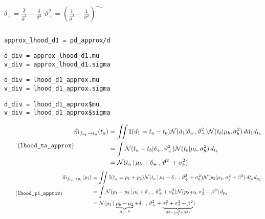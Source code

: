 \documentclass[article]{jss}
\newif\ifen
\newif\ifes
\newcommand{\en}[1]{\ifen#1\fi}
\newcommand{\es}[1]{\ifes#1\fi}
\newcommand{\N}{\mathcal{N}}
\begin{document}
%
\en{with} $\delta_{\div} = \frac{\widehat{\delta}}{\widehat{\vartheta}^2} - \frac{\delta}{\vartheta^2}$ \en{and} $\vartheta_{\div}^2 = (\frac{1}{\widehat{\vartheta}^2} - \frac{1}{\vartheta^2})^{-1}$ 
%
\begin{lstlisting}[backgroundcolor=\color
{white},label=lst:d_div, caption=\relax, belowskip=-1.0 \baselineskip, aboveskip=-0 \baselineskip]
\end{lstlisting}
\begin{lstlisting}[backgroundcolor=\color{all},belowskip=-0.77 \baselineskip]
approx_lhood_d1 = pd_approx/d
\end{lstlisting}  
\begin{paracol}{3}
\begin{lstlisting}[backgroundcolor=\color{julia}]
d_div = approx_lhood_d1.mu
v_div = approx_lhood_d1.sigma
\end{lstlisting}
\switchcolumn
\begin{lstlisting}[backgroundcolor=\color{python}]
d_div = lhood_d1_approx.mu
v_div = lhood_d1_approx.sigma
\end{lstlisting}
\switchcolumn
\begin{lstlisting}[backgroundcolor=\color{r}]
d_div = lhood_d1_approx$mu
v_div = lhood_d1_approx$sigma
\end{lstlisting}
\end{paracol}
%
\begin{equation}\label{eq:^m_fd_ta} \tag{\texttt{lhood\_ta\_approx}}
\begin{split}
\widehat{m}_{f_{d_1} \rightarrow t_a}(t_a) & =  \iint \mathbb{I}(d_1 = t_a - t_b) \N(d_1 | \delta_{\div}, \vartheta_{\div}^2) \N(t_b | \mu_b , \sigma_b^2 )  \, d{d_1} d_{t_b} \\
& = \int  \N( t_a-t_b | \delta_{\div}, \vartheta_{\div}^2) \N(t_b | \mu_b , \sigma_b^2 )  \,  d_{t_b} \\
& = \N(t_a \, | \, \mu_b + \delta_{\div} \, , \, \vartheta_{\div}^2 + \sigma_b^2) \\
\end{split}
\end{equation}
%
\begin{equation}\label{eq:^m_fta_p} \tag{\texttt{lhood\_p1\_approx}}
\begin{split}
\widehat{m}_{f_{t_a} \rightarrow p_1}(p_1) &= \iint \mathbb{I}(t_a = p_1 + p_2) \N(t_a \, | \, \mu_b + \delta_{\div} \, , \, \vartheta_{\div}^2 + \sigma_b^2) \N(p_2 | \mu_2 , \sigma_2^2 + \beta^2)  \, d{t_a} d_{p_2} \\
& = \int \N(p_1 + p_2 \, | \, \mu_b + \delta_{\div} \, , \, \vartheta_{\div}^2 + \sigma_b^2) \N(p_2 | \mu_2 , \sigma_2^2+ \beta^2 )   \, d_{p_2} \\
& = \N( p_1 \,|\,  \underbrace{\mu_b - \mu_2}_{\mu_1-\delta} + \delta_{\div}  \,,\,\vartheta_{\div}^2 + \underbrace{\sigma_b^2 + \sigma_2^2 + \beta^2}_{\vartheta^2 - (\sigma_1^2 + \beta^2)})  \\
\end{split}
\end{equation}
\end{document}
